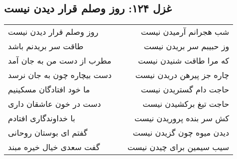 \begin{center}
\section*{غزل ۱۲۴: روز وصلم قرار دیدن نیست}
\label{sec:124}
\begin{longtable}{l p{0.5cm} r}
روز وصلم قرار دیدن نیست
&&
شب هجرانم آرمیدن نیست
\\
طاقت سر بریدنم باشد
&&
وز حبیبم سر بریدن نیست
\\
مطرب از دست من به جان آمد
&&
که مرا طاقت شنیدن نیست
\\
دست بیچاره چون به جان نرسد
&&
چاره جز پیرهن دریدن نیست
\\
ما خود افتادگان مسکینیم
&&
حاجت دام گستریدن نیست
\\
دست در خون عاشقان داری
&&
حاجت تیغ برکشیدن نیست
\\
با خداوندگاری افتادم
&&
کش سر بنده پروریدن نیست
\\
گفتم ای بوستان روحانی
&&
دیدن میوه چون گزیدن نیست
\\
گفت سعدی خیال خیره مبند
&&
سیب سیمین برای چیدن نیست
\\
\end{longtable}
\end{center}

